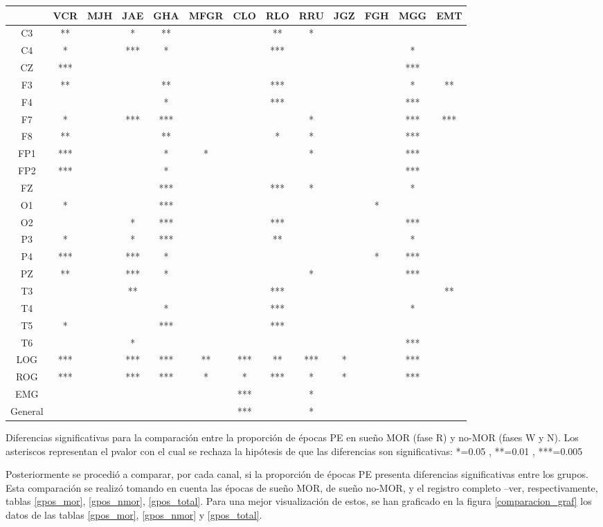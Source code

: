 \begin{SidewaysFigure}
\centering
\begin{tabular}{c||ccccc||cccc||ccc}
&VCR&MJH&JAE&GHA&MFGR&CLO&RLO&RRU&JGZ&FGH&MGG&EMT \\
\hline
C3&**& &*&**& & &**&*& & & &  \\
C4&*& &***&*& & &***& & & &*&  \\
CZ&***& & & & & & & & & &***&  \\
F3&**& & &**& & &***& & & &*&** \\
F4& & & &*& & &***& & & &***&  \\
F7&*& &***&***& & & &*& & &***&*** \\
F8&**& & &**& & &*&*& & &***&  \\
FP1&***& & &*&*& & &*& & &***&  \\
FP2&***& & &*& & & & & & &***&  \\
FZ& & & &***& & &***&*& & &*&  \\
O1&*& & &***& & & & & &*& &  \\
O2& & &*&***& & &***& & & &***& \\ 
P3&*& &*&***& & &**& & & &*&  \\
P4&***& &***&*& & & & & &*&***&  \\
PZ&**& &***&*& & & &*& & &***&  \\
T3& & &**& & & &***& & & & &** \\
T4& & & &*& & &***& & & &*&  \\
T5&*& & &***& & &***& & & & &  \\
T6& & &*& & & & & & & &***&  \\
LOG&***& &***&***&**&***&**&***&*& &***&  \\
ROG&***& &***&***&*&*&***&*&*& &***&  \\
EMG& & & & & &***& &*& & & &  \\
\hline
General& & & & & &***& &*& & & & 
\end{tabular}
\caption{Diferencias significativas para la comparaci\'on entre la proporci\'on
de \'epocas PE en sue\~no MOR (fase R) y no-MOR (fases W y N).
Los asteriscos representan el pvalor con el cual se rechaza la hip\'otesis de
que las diferencias son significativas: *=0.05 , **=0.01 , ***=0.005}
\label{comparacion_mor_vs_total}
\end{SidewaysFigure}


Posteriormente se procedi\'o a comparar, por cada canal, si la proporci\'on de \'epocas PE
presenta diferencias significativas entre los grupos. Esta comparaci\'on se realiz\'o tomando
en cuenta las \'epocas de sue\~no MOR, de sue\~no no-MOR, y el registro completo 
--ver, respectivamente, tablas \ref{gpos_mor}, \ref{gpos_nmor}, \ref{gpos_total}.
Para una mejor visualizaci\'on de estos, se han graficado
en la figura \ref{comparacion_graf}
los datos de las tablas \ref{gpos_mor}, \ref{gpos_nmor} y
\ref{gpos_total}.

